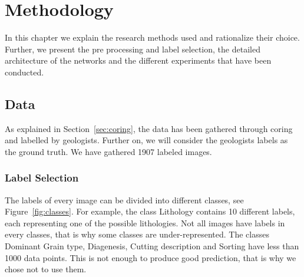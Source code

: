 \chapter{Methodology}\label{chp:methodology}
In this chapter we explain the research methods used and rationalize their choice. Further, we present the pre processing and label selection, the detailed architecture of the networks and the different experiments that have been conducted. 
\section{Data}

As explained in Section~\ref{sec:coring}, the data has been gathered through coring and labelled by geologists. Further on, we will consider the geologists labels as the ground truth. We have gathered 1907 labeled images. 

\subsection{Label Selection}
 The labels of every image can be divided into different classes, see Figure~\ref{fig:classes}. For example, the class Lithology contains 10 different labels, each representing one of the possible lithologies. Not all images have labels in every classes, that is why some classes are under-represented. The classes Dominant Grain type, Diagenesis, Cutting description and Sorting have less than 1000 data points. This is not enough to produce good prediction, that is why we chose not to use them.
 
